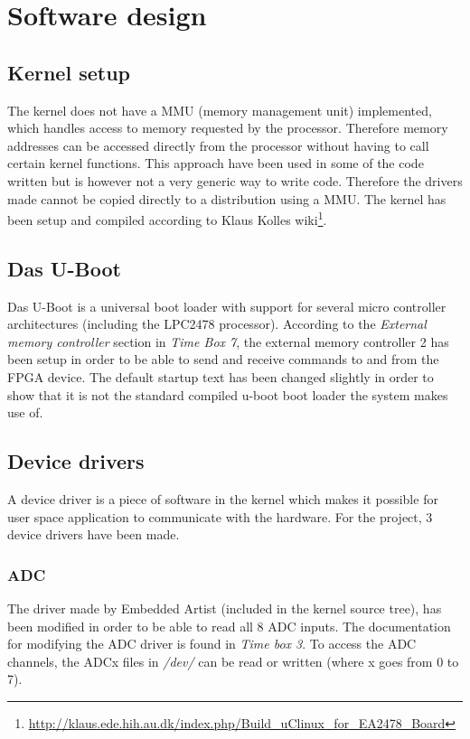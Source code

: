 \chapter{Software design}
\section{Kernel setup}
%
The kernel does not have a MMU (memory management unit) implemented, which handles access to memory requested by the processor. Therefore memory addresses can be accessed directly from the processor without having to call certain kernel functions. This approach have been used in some of the code written but is however not a very generic way to write code. Therefore the drivers made cannot be copied directly to a distribution using a MMU.
\p The kernel has been setup and compiled according to Klaus Kolles wiki\footnote{\url{http://klaus.ede.hih.au.dk/index.php/Build_uClinux_for_EA2478_Board}}.

\section{Das U-Boot}
%
Das U-Boot is a universal boot loader with support for several micro controller architectures (including the LPC2478 processor).
\p According to the \textit{External memory controller} section in \textit{Time Box 7}, the external memory controller 2 has been setup in order to be able to send and receive commands to and from the FPGA device. 
\p The default startup text has been changed slightly in order to show that it is not the standard compiled u-boot boot loader the system makes use of. 

\section{Device drivers}
%
A device driver is a piece of software in the kernel which makes it possible for user space application to communicate with the hardware. For the project, 3 device drivers have been made.
\subsection{ADC}
The driver made by Embedded Artist (included in the kernel source tree), has been modified in order to be able to read all 8 ADC inputs. The documentation for modifying the ADC driver is found in \textit{Time box 3}. 
\p To access the ADC channels, the ADCx files in \textit{/dev/} can be read or written (where x goes from 0 to 7).
